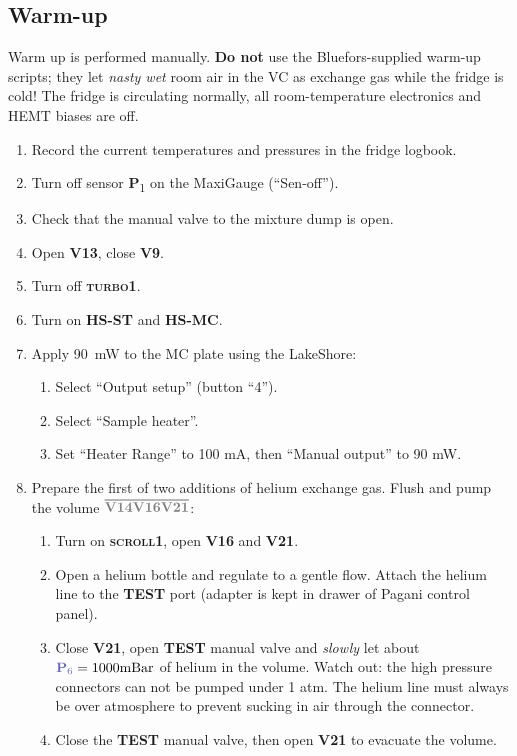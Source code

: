 \documentclass{article}[18pt,A4]
\newcommand{\mBar}{\mathrm{mBar}}
\newcommand{\thing}[1]{{\color{gray}\textsc{ \textbf{#1}}}}
\newcommand{\valve}[1]{{\color{gray}\textbf{V#1}}}
\newcommand{\pressure}[1]{{\color{pressurecolor}\textbf{P}\textsubscript{#1}}}
\newcommand{\volume}[1]{\ensuremath{\overline{#1}}}
\begin{document}
\subsection{Warm-up}
Warm up is performed manually. \textbf{Do not} use the Bluefors-supplied warm-up scripts; they let \emph{nasty wet} room air in the VC as exchange gas while the fridge is cold!
The fridge is circulating normally, all room-temperature electronics and HEMT biases are off.
\begin{enumerate}
    \item Record the current temperatures and pressures in the fridge logbook.
    \item Turn off sensor \pressure{1} on the MaxiGauge (``Sen-off'').
    \item Check that the manual valve to the mixture dump is open.
    \item Open \valve{13}, close \valve{9}.
    \item Turn off \thing{turbo1}.
    \item Turn on \thing{HS-ST} and \thing{HS-MC}. 
    \item Apply 90~mW to the MC plate using the LakeShore:
        \begin{enumerate}
        \item Select ``Output setup'' (button ``4'').
        \item Select ``Sample heater''.
        \item Set ``Heater Range'' to 100 mA, then ``Manual output'' to 90 mW.
        \end{enumerate}
    \item Prepare the first of two additions of helium exchange gas. Flush and pump the volume \volume{\valve{14} \valve{16} \valve{21}}:
        \begin{enumerate}
        \item Turn on \thing{scroll1}, open \valve{16} and \valve{21}.
        \item Open a helium bottle and regulate to a gentle flow.
        Attach the helium line to the \thing{TEST} port (adapter is kept in drawer of Pagani control panel).
        \item Close \valve{21}, open \thing{TEST} manual valve and \emph{slowly} let about $\pressure{6} = 1000 \mBar$ of helium in the volume. Watch out: the high pressure connectors can not be pumped under 1 atm. The helium line must always be
over atmosphere to prevent sucking in air through the
connector. 
        \item Close the \thing{TEST} manual valve, then open \valve{21} to evacuate the volume.

\end{enumerate}
\end{enumerate}
\end{document}
